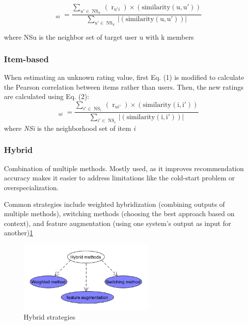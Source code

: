 \documentclass[10pt,twoside,english,a4paper]{article}
\begin{document}
\begin{equation*} \mathop {\tilde {r}}\nolimits _{ui} =\frac {\sum \limits _{u'\in \mathop {NS}\nolimits _{u}} {(\mathop r\nolimits _{u'i})\times (\text {similarity}(\text {u},\text {u}'))}}{\sum \limits _{u'\in \mathop {NS}\nolimits _{u}} {\vert (\text {similarity}(\text {u},\text {u}'))\vert }}\tag{1}\end{equation*}

where NSu is the neighbor set of target user u with k members

\subsubsection{Item-based}
When estimating an unknown rating value, first Eq. (1) is modified to calculate the Pearson correlation between items rather than users. Then, the new ratings are calculated using Eq. (2):
\begin{equation*} \mathop {\tilde {r}}\nolimits _{ui} =\frac {\sum \limits _{i'\in \mathop {NS}\nolimits _{i}} {(\mathop r\nolimits _{u{i}'})\times (\text {similarity}(\text {i},\text {i}'))}}{\sum \limits _{i'\in \mathop {NS}\nolimits _{i}} {\vert (\text {similarity}(\text {i},\text {i}'))\vert }}\tag{2}\end{equation*}
where \textit{NSi} is the neighborhood set of item \textit{i} \cite{8550639}

\subsubsection{Hybrid}

Combination of multiple methods. Mostly used, as it improves recommendation accuracy makes it easier to address limitations like the cold-start problem or overspecialization. 

 Common strategies include weighted hybridization (combining outputs of multiple methods), switching methods (choosing the best approach based on context), and feature augmentation (using one system's output as input for another)\ref{fig:fig7}

\begin{figure}[H]
    \centering
	\includegraphics[width=0.6\textwidth]{./diagrams/hybrid.png}
	\caption{Hybrid strategies}
	\label{fig:fig7}
\end{figure}
\end{document}
